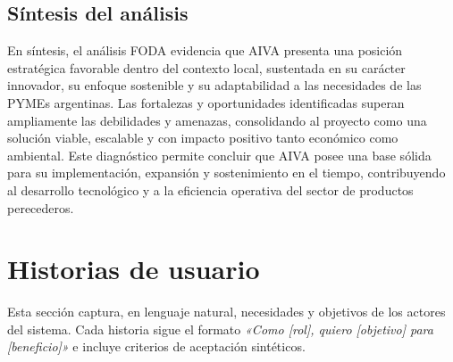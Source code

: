 \subsection{Síntesis del análisis}

En síntesis, el análisis FODA evidencia que AIVA presenta una posición estratégica favorable dentro del contexto local, sustentada en su carácter innovador, su enfoque sostenible y su adaptabilidad a las necesidades de las PYMEs argentinas. Las fortalezas y oportunidades identificadas superan ampliamente las debilidades y amenazas, consolidando al proyecto como una solución viable, escalable y con impacto positivo tanto económico como ambiental. Este diagnóstico permite concluir que AIVA posee una base sólida para su implementación, expansión y sostenimiento en el tiempo, contribuyendo al desarrollo tecnológico y a la eficiencia operativa del sector de productos perecederos.


\vspace{1cm}
\section{Historias de usuario}
Esta sección captura, en lenguaje natural, necesidades y objetivos de los actores del sistema. Cada historia sigue el formato \emph{«Como [rol], quiero [objetivo] para [beneficio]»} e incluye criterios de aceptación sintéticos.

